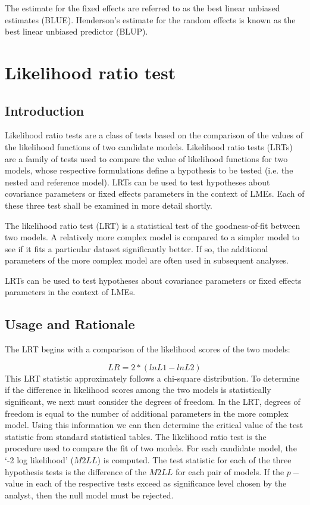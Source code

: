 \documentclass[12pt, a4paper]{article}
\begin{document}
The estimate for the fixed effects are referred to as the best linear unbiased estimates (BLUE). Henderson's estimate for the random effects is known as the best linear unbiased predictor (BLUP).

\section{Likelihood ratio test}



\subsection{Introduction}
Likelihood ratio tests are a class of tests based on the comparison of the values of the likelihood functions of two candidate models.
Likelihood ratio tests (LRTs) are a family of tests used to compare the value of likelihood functions for two models, whose respective formulations define a hypothesis to be tested (i.e. the nested and reference model). LRTs can be used to test hypotheses about covariance parameters or fixed effects parameters in the context of LMEs.  Each of these three test shall be examined in more detail shortly.
	
The likelihood ratio test (LRT) is a statistical test of the goodness-of-fit between two models. A relatively more complex model is compared to a simpler model to see if it fits a particular dataset significantly better. If so, the additional parameters of the more complex model are often used in subsequent analyses. 

LRTs can be used to test hypotheses about covariance parameters or fixed effects parameters in the context
of LMEs.

\subsection{Usage and Rationale}
The LRT begins with a comparison of the likelihood scores of the two models:

\[LR = 2*(lnL1-lnL2)\]
This LRT statistic approximately follows a chi-square distribution. To determine if the difference in likelihood scores among the two models is statistically significant, we next must consider the degrees of freedom. In the LRT, degrees of freedom is equal to the number of additional parameters in the more complex model. Using this information we can then determine the critical value of the test statistic from standard statistical tables.
\bigskip
The likelihood ratio test is the procedure used to compare the fit of two models. For each candidate model, the `-2 log likelihood' ($M2LL$) is computed. The test statistic for each of the three hypothesis tests is the difference of the $M2LL$ for each pair of models. If the $p-$value in each of the respective tests exceed as significance level chosen by the analyst, then the null model must be rejected.
\end{document}
